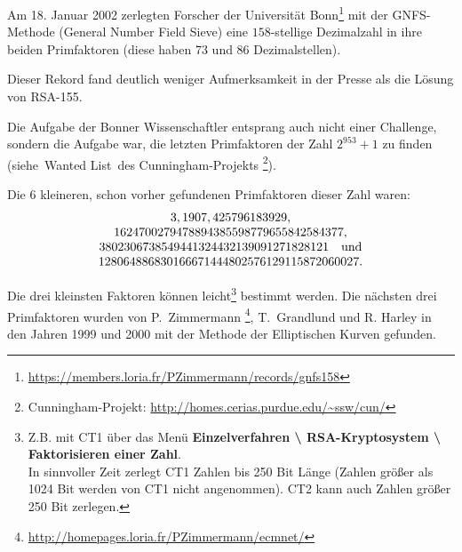 \begin{refsegment}
Am 18. Januar 2002 zerlegten Forscher der Universität Bonn\footnote{%
  \url{https://members.loria.fr/PZimmermann/records/gnfs158}
}
mit der GNFS-Methode (General Number Field Sieve)  eine $158$-stellige Dezimalzahl in ihre beiden Primfaktoren
(diese haben 73 und 86 Dezimalstellen).

Dieser Rekord fand deutlich weniger Aufmerksamkeit in der Presse als die
Lösung von RSA-155.

Die Aufgabe der Bonner Wissenschaftler entsprang auch nicht einer Challenge,
sondern die Aufgabe war, die letzten Primfaktoren der Zahl $2^{953}+1$
zu finden (siehe~\glqq Wanted List\grqq~des Cunningham-Projekts%
\footnote{%
Cunningham-Projekt: \url{http://homes.cerias.purdue.edu/~ssw/cun/}}).

Die 6 kleineren, schon vorher gefundenen Primfaktoren dieser Zahl waren:
$$
\begin{array}{c}
        3, 1907, 425796183929,\\
        1624700279478894385598779655842584377,\\
        3802306738549441324432139091271828121 \quad{\rm und}\\
        128064886830166671444802576129115872060027.
\end{array}
$$
\begin{sloppypar}
Die drei kleinsten Faktoren können leicht\footnote{%
Z.B. mit CT1 über das Menü
{\bf Einzelverfahren \textbackslash{} RSA-Kryptosystem \textbackslash{}
Faktorisieren einer Zahl}.\\
In sinnvoller Zeit zerlegt CT1 Zahlen bis 250 Bit Länge (Zahlen größer als
1024 Bit werden von CT1 nicht angenommen). CT2 kann auch
Zahlen größer 250 Bit zerlegen.
}
bestimmt werden.
Die nächsten drei Primfaktoren wurden von P.~Zimmermann%
\footnote{\url{http://homepages.loria.fr/PZimmermann/ecmnet/}},
T.~Grandlund und R. Harley in den Jahren 1999 und 2000 mit der Methode
der Elliptischen Kurven gefunden.
\end{sloppypar}


\end{refsegment}
